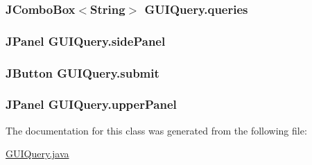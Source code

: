 \subsubsection[{\texorpdfstring{queries}{queries}}]{\setlength{\rightskip}{0pt plus 5cm}J\+Combo\+Box$<$String$>$ G\+U\+I\+Query.\+queries\hspace{0.3cm}{\ttfamily [protected]}}\hypertarget{classGUIQuery_a0db8bd960b4512cadf9aa40642934680}{}\label{classGUIQuery_a0db8bd960b4512cadf9aa40642934680}
\subsubsection[{\texorpdfstring{side\+Panel}{sidePanel}}]{\setlength{\rightskip}{0pt plus 5cm}J\+Panel G\+U\+I\+Query.\+side\+Panel\hspace{0.3cm}{\ttfamily [protected]}}\hypertarget{classGUIQuery_a70e233b1f14874166b7707edebe825d2}{}\label{classGUIQuery_a70e233b1f14874166b7707edebe825d2}
\subsubsection[{\texorpdfstring{submit}{submit}}]{\setlength{\rightskip}{0pt plus 5cm}J\+Button G\+U\+I\+Query.\+submit\hspace{0.3cm}{\ttfamily [protected]}}\hypertarget{classGUIQuery_a6580b15e365bc754c1a5ccdd2d58a4bb}{}\label{classGUIQuery_a6580b15e365bc754c1a5ccdd2d58a4bb}
\subsubsection[{\texorpdfstring{upper\+Panel}{upperPanel}}]{\setlength{\rightskip}{0pt plus 5cm}J\+Panel G\+U\+I\+Query.\+upper\+Panel\hspace{0.3cm}{\ttfamily [protected]}}\hypertarget{classGUIQuery_a37a678b81901083072a73283d7acf52f}{}\label{classGUIQuery_a37a678b81901083072a73283d7acf52f}


The documentation for this class was generated from the following file\+:\begin{DoxyCompactItemize}
\item 
\hyperlink{GUIQuery_8java}{G\+U\+I\+Query.\+java}\end{DoxyCompactItemize}
